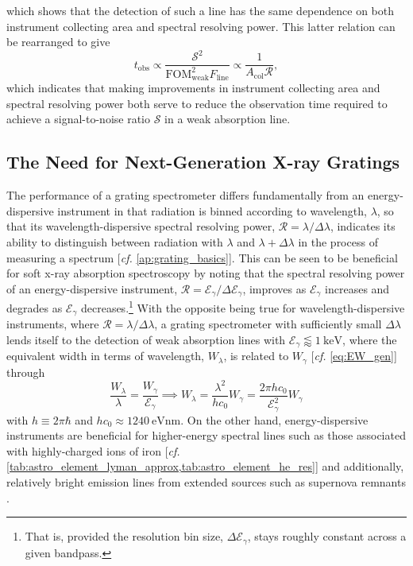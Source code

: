which shows that the detection of such a line has the same dependence on both instrument collecting area and spectral resolving power. %
This latter relation can be rearranged to give 
\begin{equation}
 t_{\text{obs}} \propto \frac{\mathcal{S}^2}{\text{FOM}_{\text{weak}}^2 F_{\text{line}}} \propto \frac{1}{A_{\text{col}} \mathscr{R}} ,
 \end{equation}
which indicates that making improvements in instrument collecting area and spectral resolving power both serve to reduce the observation time required to achieve a signal-to-noise ratio $\mathcal{S}$ in a weak absorption line. 

\subsection{The Need for Next-Generation X-ray Gratings}\label{sec:need_gratings}
The performance of a grating spectrometer differs fundamentally from an energy-dispersive instrument in that radiation is binned according to wavelength, $\lambda$, so that its wavelength-dispersive spectral resolving power, $\mathscr{R} = \lambda / \Delta \lambda$, indicates its ability to distinguish between radiation with $\lambda$ and $\lambda + \Delta \lambda$ in the process of measuring a spectrum [\emph{cf.\@} \cref{ap:grating_basics}]. 
This can be seen to be beneficial for soft x-ray absorption spectroscopy by noting that the spectral resolving power of an energy-dispersive instrument, $\mathscr{R} = \mathcal{E}_{\gamma} / \Delta \mathcal{E}_{\gamma}$, improves as $\mathcal{E}_{\gamma}$ increases and degrades as $\mathcal{E}_{\gamma}$ decreases.\footnote{That is, provided the resolution bin size, $\Delta \mathcal{E}_{\gamma}$, stays roughly constant across a given bandpass.} 
With the opposite being true for wavelength-dispersive instruments, where $\mathscr{R} = \lambda / \Delta \lambda$, a grating spectrometer with sufficiently small $\Delta \lambda$ lends itself to the detection of weak absorption lines with $\mathcal{E}_{\gamma} \lessapprox \SI{1}{\kilo\electronvolt}$, where the equivalent width in terms of wavelength, $W_{\lambda}$, is related to $W_{\gamma}$ [\emph{cf.\@} \cref{eq:EW_gen}] through 
\begin{equation}
 \frac{W_{\lambda}}{\lambda} = \frac{W_{\gamma}}{\mathcal{E}_{\gamma}} \implies W_{\lambda} = \frac{\lambda^2}{h c_0} W_{\gamma} = \frac{2 \pi h c_0}{\mathcal{E}^2_{\gamma}} W_{\gamma} 
 \end{equation}
with $h \equiv 2 \pi \hbar$ and $h c_0 \approx \SI{1240}{\electronvolt\nm}$. 
On the other hand, energy-dispersive instruments are beneficial for higher-energy spectral lines such as those associated with highly-charged ions of iron [\emph{cf.\@} \cref{tab:astro_element_lyman_approx,tab:astro_element_he_res}] and additionally, relatively bright emission lines from extended sources such as supernova remnants \cite{Dewey10,Ballet02}. 

